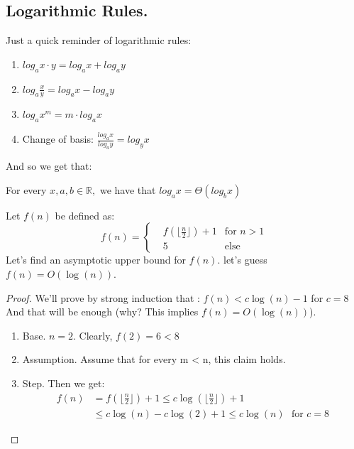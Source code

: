 \subsection{Logarithmic Rules.}

Just a quick reminder of logarithmic rules:
\begin{enumerate}
\item $log_{a}x\cdot y=log_{a}x+log_{a}y$
\item $log_{a}\frac{x}{y}=log_{a}x-log_{a}y$
\item $log_{a}x^{m}=m\cdot log_{a}x$
\item Change of basis: $\frac{log_{a}x}{log_{a}y}=log_{y}x$
\end{enumerate}
And so we get that:
\begin{remark}
For every $x,a,b\in\mathbb{R},$ we have that $log_{a}x=\Theta(log_{b}x)$
\end{remark}

\begin{example} Let \(f(n)\) be defined as:
\begin{equation*}
f(n) = \left\{ \begin{array}{rcl}
& f\left( \lfloor  \frac{n}{2} \rfloor \right) + 1 & \mbox{for }  n > 1  \\
& 5 & \mbox{else}  
\end{array}\right.
\end{equation*}
Let’s find an asymptotic upper bound for \(f(n)\). let's guess \( f(n) = O(\log(n)) \).

\begin{proof}  We’ll prove by strong induction that : \(f(n) < c \log(n) - 1\) for \(c =8 \) And that will be enough (why? This implies \(f(n) = O(\log(n))\)).
  \begin{enumerate}
    \item      Base. \(n = 2\). Clearly, \(f(2) = 6 < 8 \)
    \item      Assumption. Assume that for every m < n, this claim holds.
    \item      Step. Then we get:
      \begin{equation*} \begin{split}
	  f(n) &= f\left( \lfloor  \frac{n}{2} \rfloor \right) + 1 \le c\log\left(  \lfloor\frac{n}{2}\rfloor\right)  + 1  \\ & \le c\log\left(n\right) - c\log\left(2\right) + 1 
	  \le c\log\left(n\right) \ \ \ \text{for } c = 8
	\end{split}
      \end{equation*}
  \end{enumerate}
\end{proof}
\end{example}

